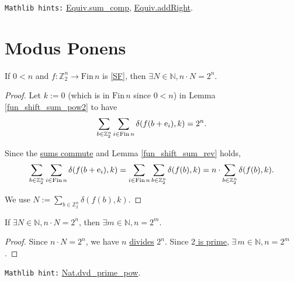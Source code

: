 \documentclass[11pt]{amsart}
\newcommand{\Zz}{\mathbb{Z}_2}
\newcommand{\Fin}{\mathrm{Fin}\,}
\newcommand{\B}{\color{blue}}
\begin{document}
\verb|Mathlib hints:| \href{https://leanprover-community.github.io/mathlib4_docs/Mathlib/Algebra/BigOperators/Group/Finset/Defs.html#Equiv.sum_comp}{Equiv.sum\_comp}, \href{https://leanprover-community.github.io/mathlib4_docs/Mathlib/Algebra/Group/Units/Equiv.html#Equiv.addRight}{Equiv.addRight}.

\bigskip

\section{Modus Ponens}

\bigskip

\begin{lemma} 
\label{strategy_pow2} If $0<n$ and $f:\Zz^n \to \Fin n$ is \eqref{SF}, then $\exists N\in\mathbb{N}, n\cdot N = 2^n$.
\end{lemma}

\begin{proof} 
{\B Let} $k := 0$ (which is in $\Fin n$ since $0<n$) in Lemma \ref{fun_shift_sum_pow2} to {\B have}
$$\sum_{b\in\Zz^n} \sum_{i\in\Fin n} \delta(f(b+{\rm e}_i),k) = 2^n.$$ 

Since the \href{https://leanprover-community.github.io/mathlib4_docs/Mathlib/Algebra/BigOperators/Group/Finset/Sigma.html#Finset.sum_comm}{sums commute} and Lemma \ref{fun_shift_sum_rev} holds,  
$$\sum_{b\in\Zz^n} \sum_{i\in\Fin n} \delta(f(b+{\rm e}_i),k) = \sum_{i\in\Fin n} \sum_{b\in\Zz^n} \delta(f(b),k) = n \cdot \sum_{b\in\Zz^n} \delta(f(b),k).$$

We {\B use} $N := \sum_{b\in\Zz^n} \delta(f(b),k)$.
\end{proof}

\bigskip

\begin{lemma}
\label{mul_pow2} If $\exists N\in\mathbb{N}, n\cdot N = 2^n$, then $\exists m\in\mathbb{N}, n = 2^m$.
\end{lemma}

\begin{proof}
Since $n\cdot N = 2^n$, we {\B have} $n$ \href{https://leanprover-community.github.io/mathlib4_docs/Mathlib/Algebra/Divisibility/Basic.html#Dvd.intro}{divides} $2^n$. Since \href{https://leanprover-community.github.io/mathlib4_docs/Mathlib/Data/Nat/Prime/Defs.html#Nat.prime_two}{  $2$ is prime}, $\exists\,m\in\mathbb{N}, n = 2^m$.
\end{proof}

\verb|Mathlib hint:| \href{https://leanprover-community.github.io/mathlib4_docs/Mathlib/Data/Nat/Prime/Basic.html#Nat.dvd_prime_pow}{Nat.dvd\_prime\_pow}.
\end{document}

